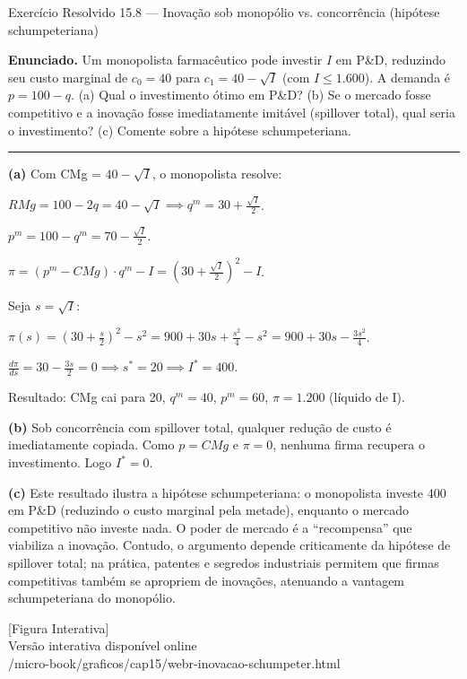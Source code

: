 \documentclass[11pt,twoside,openright]{book}
\newcommand{\figurePlaceholder}[1]{%
  \begin{center}
    \begin{tcolorbox}[
      width=0.85\textwidth,
      colback=graybg,
      colframe=gray,
      boxrule=0.5pt,
      arc=2pt,
      halign=center,
      valign=center,
      height=5cm
    ]
      \centering
      \vfill
      {\sffamily\color{gray}\large [Figura Interativa]}\\[6pt]
      {\sffamily\small\color{gray} Versão interativa disponível online}\\[4pt]
      {\ttfamily\tiny\color{gray} #1}
      \vfill
    \end{tcolorbox}
  \end{center}
}
\begin{document}
\begin{exresolvidobox}{Exercício Resolvido 15.8 — Inovação sob monopólio vs. concorrência (hipótese schumpeteriana)}

\textbf{Enunciado.} Um monopolista farmacêutico pode investir \(I\) em
P\&D, reduzindo seu custo marginal de \(c_0 = 40\) para
\(c_1 = 40 - \sqrt{I}\) (com \(I \leq 1.600\)). A demanda é
\(p = 100 - q\). (a) Qual o investimento ótimo em P\&D? (b) Se o mercado
fosse competitivo e a inovação fosse imediatamente imitável (spillover
total), qual seria o investimento? (c) Comente sobre a hipótese
schumpeteriana.

\begin{center}\rule{0.5\linewidth}{0.5pt}\end{center}

\textbf{(a)} Com CMg = \(40 - \sqrt{I}\), o monopolista resolve:

\(RMg = 100 - 2q = 40 - \sqrt{I} \implies q^m = 30 + \frac{\sqrt{I}}{2}\).

\(p^m = 100 - q^m = 70 - \frac{\sqrt{I}}{2}\).

\(\pi = (p^m - CMg) \cdot q^m - I = \left(30 + \frac{\sqrt{I}}{2}\right)^2 - I\).

Seja \(s = \sqrt{I}\):

\(\pi(s) = \left(30 + \frac{s}{2}\right)^2 - s^2 = 900 + 30s + \frac{s^2}{4} - s^2 = 900 + 30s - \frac{3s^2}{4}\).

\(\frac{d\pi}{ds} = 30 - \frac{3s}{2} = 0 \implies s^* = 20 \implies I^* = 400\).

Resultado: CMg cai para 20, \(q^m = 40\), \(p^m = 60\), \(\pi = 1.200\)
(líquido de I).

\textbf{(b)} Sob concorrência com spillover total, qualquer redução de
custo é imediatamente copiada. Como \(p = CMg\) e \(\pi = 0\), nenhuma
firma recupera o investimento. Logo \(I^* = 0\).

\textbf{(c)} Este resultado ilustra a hipótese schumpeteriana: o
monopolista investe 400 em P\&D (reduzindo o custo marginal pela
metade), enquanto o mercado competitivo não investe nada. O poder de
mercado é a ``recompensa'' que viabiliza a inovação. Contudo, o
argumento depende criticamente da hipótese de spillover total; na
prática, patentes e segredos industriais permitem que firmas
competitivas também se apropriem de inovações, atenuando a vantagem
schumpeteriana do monopólio.

\end{exresolvidobox}

\figurePlaceholder{/micro-book/graficos/cap15/webr-inovacao-schumpeter.html}
\end{document}

